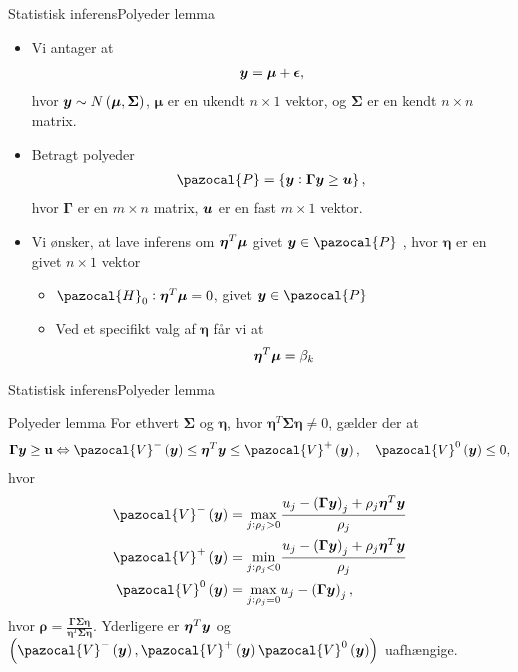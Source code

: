 \begin{frame}{Statistisk inferens}{Polyeder lemma}
\begin{itemize}
\item Vi antager at 
\begin{align*}
\vy = \vmu + \veps, 
\end{align*}
hvor $\vy \sim N\del{\boldsymbol\mu, \boldsymbol\Sigma}$, $\boldsymbol \mu$ er en ukendt $n \times 1$ vektor, og $\boldsymbol\Sigma$ er en kendt $n \times n$ matrix. 
\item Betragt polyeder
\begin{align*}
\pazocal{P} = \cbr{\vy: \boldsymbol \Gamma \vy \geq \vu},
\end{align*} 
hvor $\boldsymbol \Gamma $ er en $m \times n$ matrix, $\bm{u}$ er en fast $m \times 1$ vektor.
\item Vi ønsker, at lave inferens om $\boldsymbol \eta^T \bm{\mu}$ givet $\vy \in \pazocal{P}$ , hvor $\boldsymbol \eta$ er en givet $n \times 1$ vektor
\begin{itemize}
\item $\pazocal{H}_0: \boldsymbol \eta^T \boldsymbol \mu = 0$, givet $\vy \in \pazocal{P}$
\item Ved et specifikt valg af $\boldsymbol \eta$ får vi at 
\begin{align*}
\boldsymbol \eta^T \bm{\mu} = \beta_k
\end{align*}
\end{itemize} 
\end{itemize}
\end{frame}

\begin{frame}{Statistisk inferens}{Polyeder lemma}
\begin{block}{Polyeder lemma}
For ethvert $\boldsymbol \Sigma$ og $\boldsymbol \eta$, hvor $\boldsymbol \eta^T \boldsymbol  \Sigma \boldsymbol \eta \neq 0$, gælder der at
\begin{align*}
\boldsymbol \Gamma \vy \geq \textbf{u} \Leftrightarrow \pazocal{V}^- \del{\vy} \leq \boldsymbol \eta^T \vy \leq  \pazocal{V}^+\del{\vy}, \quad  \pazocal{V}^0 \del{\vy} \leq 0,
\end{align*}
hvor 
\begin{align*}
\pazocal{V}^- \del{\vy} & = \underset{j: \rho_j >0}{\max} \frac{u_j - \del{ \boldsymbol \Gamma \vy}_j + \rho_j \boldsymbol \eta^T \vy}{\rho_j} \\
\pazocal{V}^+ \del{\vy} & = \underset{j: \rho_j < 0}{\min} \frac{u_j - \del{ \boldsymbol \Gamma \vy}_j + \rho_j \boldsymbol \eta^T \vy}{\rho_j}  \\
\pazocal{V}^0 \del{\vy}  &=  \underset{j: \rho_j = 0}{\max} u_j -  \del{ \boldsymbol \Gamma \vy}_j
,\end{align*}
hvor $\boldsymbol \rho = \frac{\boldsymbol \Gamma \boldsymbol \Sigma \boldsymbol \eta}{\boldsymbol \eta^T \boldsymbol \Sigma \boldsymbol \eta}$. 
Yderligere er $\boldsymbol \eta^T \bm{y}$ og $\del{\pazocal{V}^- \del{\vy} , \pazocal{V}^+ \del{\vy} \pazocal{V}^0 \del{\vy}  }$ uafhængige.
\end{block}
\end{frame}

